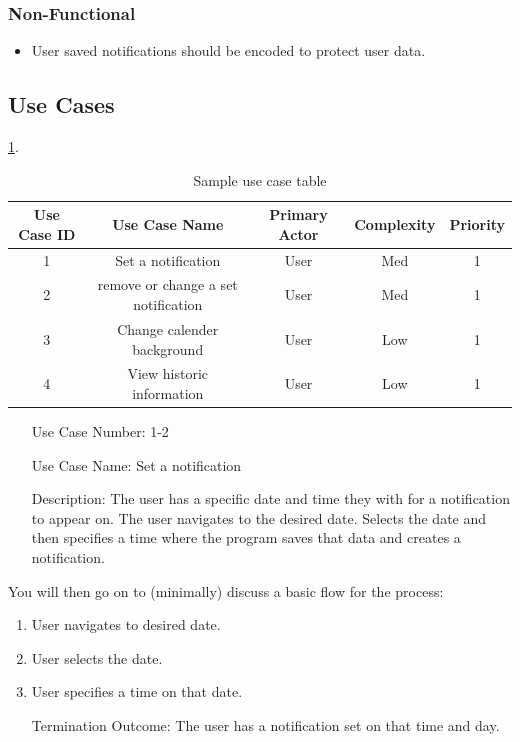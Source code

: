 \documentclass[10pt,conference,onecolumn,compsoc]{IEEEtran}
\begin{document}
\subsubsection{Non-Functional}
\begin{itemize}
\item User saved notifications should be encoded to protect user data.
\end{itemize}

\subsection{Use Cases}

\ref{tab:useCaseIndex}.




\begin{table}
\centering
\begin{tabular}{|c|c|c|c|c|}
\hline
Use Case ID & Use Case Name & Primary Actor & Complexity & Priority \\
\hline \hline
1 & Set a notification & User & Med & 1\\
\hline
\hline
2 & remove or change a set notification & User & Med & 1\\
\hline
3 & Change calender background & User & Low & 1\\
\hline
\hline
4 & View historic information & User & Low & 1\\
\hline

\end{tabular}
\caption{Sample use case table}
\label{tab:useCaseIndex}
\end{table}


\begin{itemize}
\item[Use Case Number:] 1-2
\item[Use Case Name:] Set a notification
\item[Description:] The user has a specific date and time they with for a notification to appear on. The user navigates to the desired date. Selects the date and then specifies a time where the program saves that data and creates a notification.
\end{itemize}

You will then go on to (minimally) discuss a basic flow for the process:

\begin{enumerate}
\item User navigates to desired date.
\item User selects the date.
\item User specifies a time on that date.
\item[Termination Outcome:] The user has a notification set on that time and day.
\end{enumerate}
\end{document}
